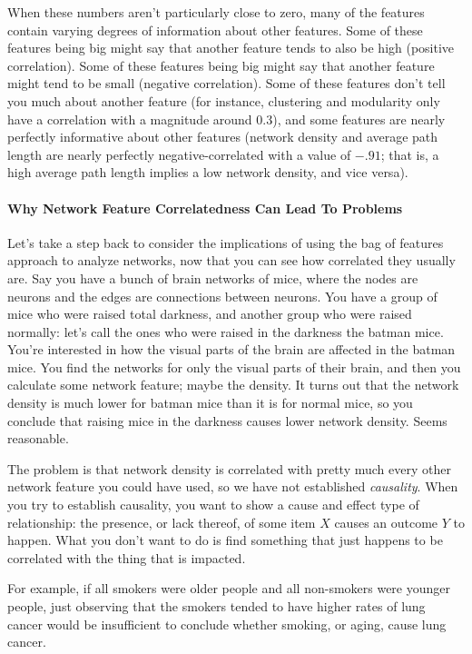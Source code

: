 When these numbers aren't particularly close to zero, many of the features contain varying degrees of information about other features. Some of these features being big might say that another feature tends to also be high (positive correlation). Some of these features being big might say that another feature might tend to be small (negative correlation). Some of these features don't tell you much about another feature (for instance, clustering and modularity only have a correlation with a magnitude around $0.3$), and some features are nearly perfectly informative about other features (network density and average path length are nearly perfectly negative-correlated with a value of $-.91$; that is, a high average path length implies a low network density, and vice versa). 

\paragraph{Why Network Feature Correlatedness Can Lead To Problems}

Let's take a step back to consider the implications of using the bag of features approach to analyze networks, now that you can see how correlated they usually are. Say you have a bunch of brain networks of mice, where the nodes are neurons and the edges are connections between neurons. You have a group of mice who were raised total darkness, and another group who were raised normally: let's call the ones who were raised in the darkness the batman mice. You're interested in how the visual parts of the brain are affected in the batman mice. You find the networks for only the visual parts of their brain, and then you calculate some network feature; maybe the density. It turns out that the network density is much lower for batman mice than it is for normal mice, so you conclude that raising mice in the darkness causes lower network density. Seems reasonable.

The problem is that network density is correlated with pretty much every other network feature you could have used, so we have not established \textit{causality}. When you try to establish causality, you want to show a cause and effect type of relationship: the presence, or lack thereof, of some item $X$ {causes} an outcome $Y$ to happen. What you don't want to do is find something that just happens to be {correlated} with the thing that is impacted. 

For example, if all smokers were older people and all non-smokers were younger people, just observing that the smokers tended to have higher rates of lung cancer would be insufficient to conclude whether smoking, or aging, cause lung cancer.

